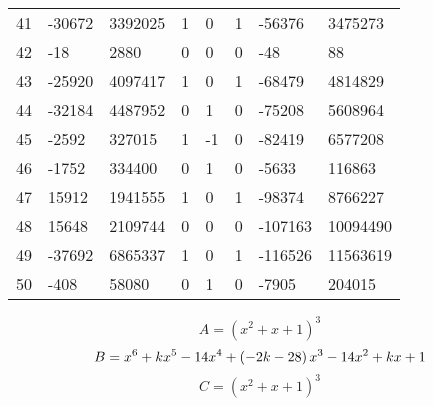 \documentclass{amsart}
\begin{document}
\begin{longtable}{|l|l|l|lllll|}
41&-30672&3392025&1&0&1&-56376&3475273\\
42&-18&2880&0&0&0&-48&88\\
43&-25920&4097417&1&0&1&-68479&4814829\\
44&-32184&4487952&0&1&0&-75208&5608964\\
45&-2592&327015&1&-1&0&-82419&6577208\\
46&-1752&334400&0&1&0&-5633&116863\\
47&15912&1941555&1&0&1&-98374&8766227\\
48&15648&2109744&0&0&0&-107163&10094490\\
49&-37692&6865337&1&0&1&-116526&11563619\\
50&-408&58080&0&1&0&-7905&204015\\
\hline
\end{longtable}
$$A=(x^2
 + x
 + 1)^{3}$$
$$B=x^6
 + k\*x^5
 - 14\*x^4
 + \left(-2\*k
 - 28\right) \*x^3
 - 14\*x^2
 + k\*x
 + 1$$
$$C=(x^2
 + x
 + 1)^{3}$$
\end{document}
